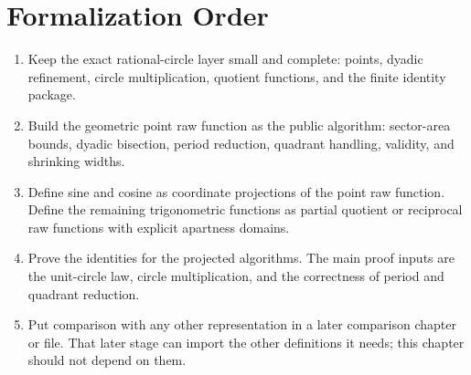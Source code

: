 \section{Formalization Order}

\begin{enumerate}
  \item Keep the exact rational-circle layer small and complete: points,
  dyadic refinement, circle multiplication, quotient functions, and the
  finite identity package.

  \item Build the geometric point raw function as the public algorithm:
  sector-area bounds, dyadic bisection, period reduction, quadrant handling,
  validity, and shrinking widths.

  \item Define sine and cosine as coordinate projections of the point raw
  function.  Define the remaining trigonometric functions as partial
  quotient or reciprocal raw functions with explicit apartness domains.

  \item Prove the identities for the projected algorithms.  The main proof
  inputs are the unit-circle law, circle multiplication, and the correctness
  of period and quadrant reduction.

  \item Put comparison with any other representation in a later comparison
  chapter or file.  That later stage can import the other definitions it
  needs; this chapter should not depend on them.
\end{enumerate}
